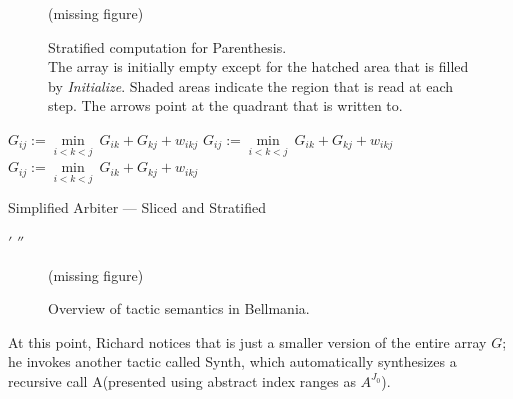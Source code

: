 \begin{figure}
\centering
\ifarmando
\bigskip(missing figure)\bigskip
\else

\fi
\caption[caption]{\label{overview:chain}
  Stratified computation for Parenthesis. \\[.2em]
  The array is initially empty except for the hatched area that is
  filled by {\it Initialize}.
  Shaded areas indicate the region that is read at each step.
  The arrows point at the quadrant that is written to. }
\end{figure}

\newcommand\applytactic[1]{{\tt >} \sf #1}
\newcommand\applytacticnode[1]{\node[right,align=left] at (3,1) {\applytactic{#1}}}


\begin{algorithm}
\renewcommand\arraystretch{1.3}
\begin{algorithmic}
\EndProcedure
      
      \State $G_{ij} :=
          \underset{i<k<j}\min ~ G_{ik} + G_{kj} + w_{ikj}$
    \EndFor
  \EndFor
      
      \State $G_{ij} :=
          \underset{i<k<j}\min ~ G_{ik} + G_{kj} + w_{ikj}$
    \EndFor
  \EndFor
      
      \State $G_{ij} :=
          \underset{i<k<j}\min ~ G_{ik} + G_{kj} + w_{ikj}$
    \EndFor
  \EndFor
\end{algorithmic}
\caption{\label{overview:breakdown}
   Simplified Arbiter --- Sliced and Stratified}
\end{algorithm}


\newbox\primebox
\setbox\primebox\hbox{$'$}
\newbox\doubleprimebox
\setbox\doubleprimebox\hbox{$''$}

\newcommand\primeocd[1]{\hspace{\wd\primebox}#1\usebox\primebox}
\newcommand\doubleprimeocd[1]{\hspace{\wd\doubleprimebox}#1\usebox\doubleprimebox}

\begin{figure}
\centering
\ifarmando
\bigskip(missing figure)\bigskip
\else

\fi
\caption[caption]{\label{overview:slice-stratify-synth}
  Overview of tactic semantics in Bellmania. }
\end{figure}


\medskip
At this point, Richard notices that {\it {}} is just a smaller version of
the entire array $G$; he invokes another tactic called {\sf Synth}, which automatically
synthesizes a recursive call A
(presented using abstract index ranges as $A^{J_0}$).

